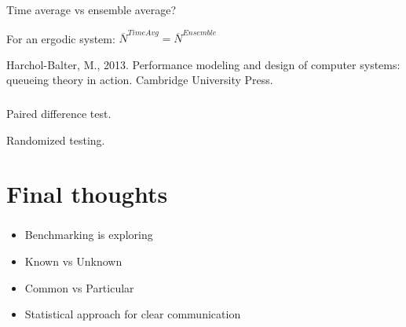 \documentclass[usenames,dvipsnames, 18pt, compress, aspectratio=169]{beamer}
\begin{document}
\begin{frame}
    \frametitle{}
    \begin{center}
        Time average vs ensemble average?

        For an ergodic system: $\overline{N}^{Time Avg} = \overline{N}^{Ensemble}$

    \linespread{0.5}
    \vspace{0.5cm}
    \color{black}\fontsize{6pt}{0}\selectfont
        Harchol-Balter, M., 2013. Performance modeling and design of computer
        systems: queueing theory in action. Cambridge University Press.
    \linespread{1.5}

    \end{center}
\end{frame}

\begin{frame}
    \frametitle{}
    \begin{center}
        Paired difference test.

        Randomized testing.
    \end{center}
\end{frame}

\section{Final thoughts}

\begin{frame}
    \frametitle{}
    \begin{center}
        \begin{itemize}
            \item Benchmarking is exploring
            \item Known vs Unknown
            \item Common vs Particular
            \item Statistical approach for clear communication
        \end{itemize}
    \end{center}
\end{frame}
\end{document}

